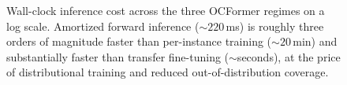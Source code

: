 \begin{figure}[htbp]
  \centering
  
  \caption{Wall-clock inference cost across the three OCFormer regimes on a log scale. Amortized forward inference (${\sim}220$\,ms) is roughly three orders of magnitude faster than per-instance training (${\sim}20$\,min) and substantially faster than transfer fine-tuning (${\sim}$seconds), at the price of distributional training and reduced out-of-distribution coverage.}
  \label{fig:rt:regime-timing}
\end{figure}
